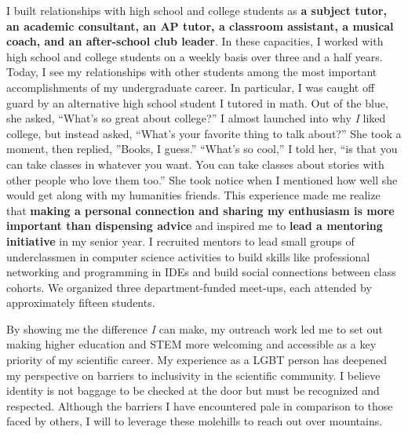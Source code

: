 \noindent
\underline{}
I built relationships with high school and college students as \textbf{a subject tutor, an academic consultant, an AP tutor, a classroom assistant, a musical coach, and an after-school club leader}.
In these capacities, I worked with high school and college students on a weekly basis over three and a half years.
Today, I see my relationships with other students among the most important accomplishments of my undergraduate career.
In particular, I was caught off guard by an alternative high school student I tutored in math.
Out of the blue, she asked, ``What's so great about college?''
I almost launched into why \textit{I} liked college, but instead asked, ``What's your favorite thing to talk about?''
She took a moment, then replied, ''Books, I guess.''
``What's so cool,'' I told her, ``is that you can take classes in whatever you want.
You can take classes about stories with other people who love them too.''
She took notice when I mentioned how well she would get along with my humanities friends.
This experience made me realize that \textbf{making a personal connection and sharing my enthusiasm is more important than dispensing advice} and inspired me to \textbf{lead a mentoring initiative} in my senior year.
I recruited mentors to lead small groups of underclassmen in computer science activities to build skills like professional networking and programming in IDEs and build social connections between class cohorts.
We organized three department-funded meet-ups, each attended by approximately fifteen students.

By showing me the difference \textit{I} can make, my outreach work led me to set out making higher education and STEM more welcoming and accessible as a key priority of my scientific career.
My experience as a LGBT person has deepened my perspective on barriers to inclusivity in the scientific community.
I believe identity is not baggage to be checked at the door but must be recognized and respected.
Although the barriers I have encountered pale in comparison to those faced by others, I will to leverage these molehills to reach out over mountains.
